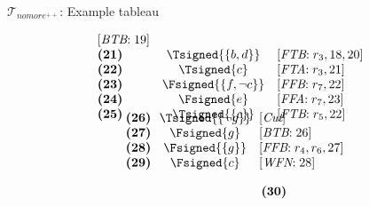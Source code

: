 \begin{frame}{$\mathcal{T}_{\textit{nomore}^{++}}$: Example tableau}
\begin{center}
\begin{minipage}[t]{16cm}
\begin{minipage}[t]{6cm}
\[\begin{array}{lcl}
  [\textit{BTB}{:}\;\text{19}]                     \\
\textbf{(21)}                                      &
  \Tsigned{\{b,d\}}                                &
  [\textit{FTB}{:}\;r_3, \text{18}, \text{20}]     \\
\textbf{(22)}                                      &
  \Tsigned{c}                                      &
  [\textit{FTA}{:}\;r_3, \text{21}]                \\
\textbf{(23)}                                      &
  \Fsigned{\{f,\neg c\}}                   &
  [\textit{FFB}{:}\;r_7, \text{22}]                \\
\textbf{(24)}                                      &
  \Fsigned{e}                                      &
  [\textit{FFA}{:}\;r_7, \text{23}]                \\
\textbf{(25)}                                      &
  \Tsigned{\{c\}}                                  &
  [\textit{FTB}{:}\;r_5, \text{22}]
\vspace{-0.7cm}
\end{array}
\]
%
\begin{minipage}[t]{1cm}
\[
\hspace{0.25cm}
\begin{array}{l@{~~}c@{~~}l}
\textbf{(26)}                                      &
  \Tsigned{\{\neg g\}}                     &
  [\textit{Cut}]                                   \\
\textbf{(27)}                                      &
  \Fsigned{g}                                      &
  [\textit{BTB}{:}\;\text{26}]                     \\
\textbf{(28)}                                      & \hspace{-0.1cm}
  \Fsigned{\{g\}}                                  \hspace{-0.1cm} &
  [\textit{FFB}{:}\;r_4, r_6, \text{27}]           \\
\textbf{(29)}                                      &
  \Fsigned{c}                                      &
  [\textit{WFN}{:}\;\text{28}]
\end{array}
\]
\end{minipage}
%
\begin{minipage}[t]{2cm}
\[
\hspace{2.75cm}
\begin{array}{l@{~~}c@{~~}l}
\textbf{(30)}                                      &

\end{array}\]
\end{minipage}
\end{minipage}
\end{minipage}
\end{center}
\end{frame}
